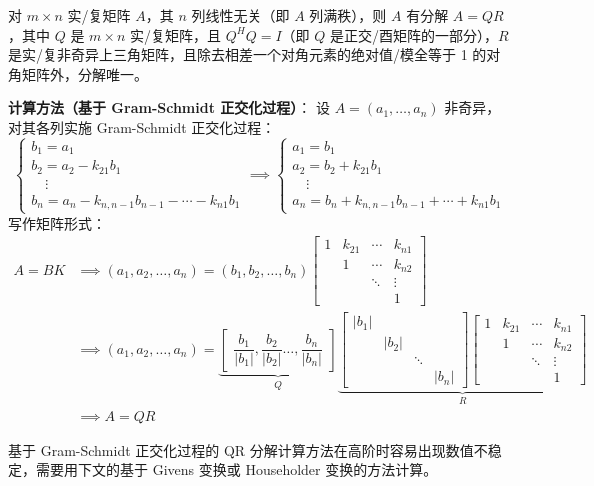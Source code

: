 \begin{theorem}[列满秩矩阵的 QR 分解]
\label{thm:qr2}
对 $m\times n$ 实/复矩阵 $A$，其 $n$ 列线性无关（即 $A$ 列满秩），则 $A$ 有分解 $A=QR$，其中 $Q$ 是 $m\times n$ 实/复矩阵，且 $Q^HQ=I$（即 $Q$ 是正交/酉矩阵的一部分），$R$ 是实/复非奇异上三角矩阵，且除去相差一个对角元素的绝对值/模全等于 1 的对角矩阵外，分解唯一。
\end{theorem}

\noindent\textbf{计算方法（基于 Gram-Schmidt 正交化过程）}：
设 $A=(a_1,\ldots,a_n)$ 非奇异，对其各列实施 Gram-Schmidt 正交化过程：
\[
    \begin{cases}
    b_1=a_1\\
    b_2=a_2-k_{21}b_1\\
    \quad\vdots\\
    b_n=a_n-k_{n,n-1}b_{n-1}-\cdots-k_{n1}b_1
    \end{cases}\implies
    \begin{cases}
    a_1=b_1\\
    a_2=b_2+k_{21}b_1\\
    \quad\vdots\\
    a_n=b_n+k_{n,n-1}b_{n-1}+\cdots+k_{n1}b_1
    \end{cases}
\]
写作矩阵形式：
\begin{align*}
    A=BK&\implies(a_1,a_2,\ldots,a_n)=(b_1,b_2,\ldots,b_n)\begin{bmatrix}1&k_{21}&\cdots&k_{n1}\\&1&\cdots&k_{n2}\\&&\ddots&\vdots\\&&&1\end{bmatrix}\\
    &\implies(a_1,a_2,\ldots,a_n)=\underbrace{\begin{bmatrix}\dfrac{b_1}{|b_1|},\dfrac{b_2}{|b_2|}\ldots,\dfrac{b_n}{|b_n|}\end{bmatrix}}_Q\underbrace{\begin{bmatrix}|b_1|&&&\\&|b_2|&&\\&&\ddots&\\&&&|b_n|\end{bmatrix}\begin{bmatrix}1&k_{21}&\cdots&k_{n1}\\&1&\cdots&k_{n2}\\&&\ddots&\vdots\\&&&1\end{bmatrix}}_R\\
    &\implies A=QR
\end{align*}
\begin{note}
基于 Gram-Schmidt 正交化过程的 QR 分解计算方法在高阶时容易出现数值不稳定，需要用下文的基于 Givens 变换或 Householder 变换的方法计算。
\end{note}

